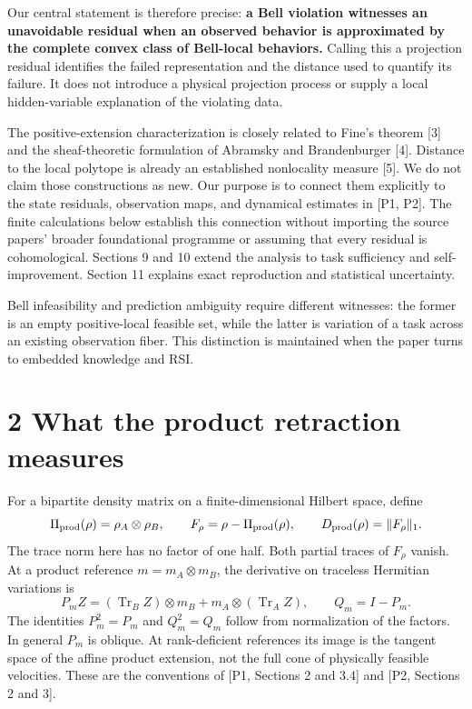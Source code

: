 \documentclass[
]{article}
\begin{document}
Our central statement is therefore precise: \textbf{a Bell violation witnesses an unavoidable residual when an observed behavior is approximated by the complete convex class of Bell-local behaviors.} Calling this a projection residual identifies the failed representation and the distance used to quantify its failure. It does not introduce a physical projection process or supply a local hidden-variable explanation of the violating data.

The positive-extension characterization is closely related to Fine's theorem {[}3{]} and the sheaf-theoretic formulation of Abramsky and Brandenburger {[}4{]}. Distance to the local polytope is already an established nonlocality measure {[}5{]}. We do not claim those constructions as new. Our purpose is to connect them explicitly to the state residuals, observation maps, and dynamical estimates in {[}P1, P2{]}. The finite calculations below establish this connection without importing the source papers' broader foundational programme or assuming that every residual is cohomological. Sections 9 and 10 extend the analysis to task sufficiency and self-improvement. Section 11 explains exact reproduction and statistical uncertainty.

Bell infeasibility and prediction ambiguity require different witnesses: the former is an empty positive-local feasible set, while the latter is variation of a task across an existing observation fiber. This distinction is maintained when the paper turns to embedded knowledge and RSI.

\section{2 What the product retraction measures}\label{what-the-product-retraction-measures}

For a bipartite density matrix on a finite-dimensional Hilbert space, define
\[
\Pi_{\rm prod}(\rho)=\rho_A\otimes\rho_B,\qquad
F_\rho=\rho-\Pi_{\rm prod}(\rho),\qquad
D_{\rm prod}(\rho)=\|F_\rho\|_1.
\]
The trace norm here has no factor of one half. Both partial traces of \(F_\rho\) vanish. At a product reference \(m=m_A\otimes m_B\), the derivative on traceless Hermitian variations is
\[
P_m Z=(\operatorname{Tr}_B Z)\otimes m_B
       +m_A\otimes(\operatorname{Tr}_A Z),\qquad Q_m=I-P_m.
\]
The identities \(P_m^2=P_m\) and \(Q_m^2=Q_m\) follow from normalization of the factors. In general \(P_m\) is oblique. At rank-deficient references its image is the tangent space of the affine product extension, not the full cone of physically feasible velocities. These are the conventions of {[}P1, Sections 2 and 3.4{]} and {[}P2, Sections 2 and 3{]}.
\end{document}
